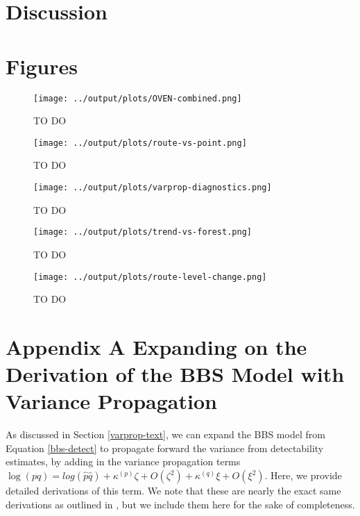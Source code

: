 \documentclass[12pt]{article}
\begin{document}
\section{Discussion}


	

\section{Figures}

\begin{figure}[h]
	\texttt{[image: ../output/plots/OVEN-combined.png]}
	\caption{TO DO}
	\label{fig:oven-combined}
\end{figure}

\begin{figure}[h]
	\texttt{[image: ../output/plots/route-vs-point.png]}
	\caption{TO DO}
	\label{fig:route-vs-point}
\end{figure}

\begin{figure}[h]
	\texttt{[image: ../output/plots/varprop-diagnostics.png]}
	\caption{TO DO}
	\label{fig:varprop-diagnostics}
\end{figure}

\begin{figure}[h]
	\texttt{[image: ../output/plots/trend-vs-forest.png]}
	\caption{TO DO}
	\label{fig:trend-vs-forest}
\end{figure}

\begin{figure}[h]
	\texttt{[image: ../output/plots/route-level-change.png]}
	\caption{TO DO}
	\label{fig:route-change}
\end{figure}

	
\section{Appendix A Expanding on the Derivation of the BBS Model with Variance Propagation}

\par As discussed in Section \ref{varprop-text}, we can expand the BBS model from Equation \ref{bbs-detect} to propagate forward the variance from detectability estimates, by adding in the variance propagation terms $	\log(pq) = log(\hat{p} \hat{q}) + \kappa^{(p)}\zeta + O(\zeta^2) + \kappa^{(q)}\xi + O(\xi^2)$.
Here, we provide detailed derivations of this term.
We note that these are nearly the exact same derivations as outlined in \citet{bravington_variance_2021}, but we include them here for the sake of completeness.
\end{document}
